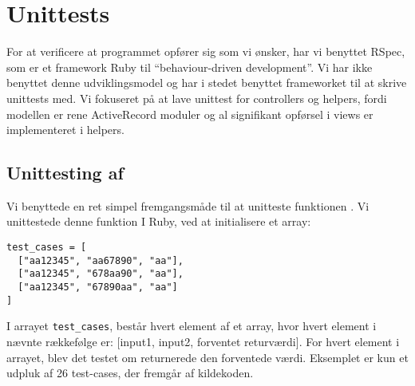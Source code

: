 \section{Unittests}
\label{sec:unittests}
For at verificere at programmet opfører sig som vi ønsker, har vi benyttet RSpec, som er et framework Ruby til ``behaviour-driven development''. Vi har ikke benyttet denne udviklingsmodel og har i stedet benyttet frameworket til at skrive unittests med.
Vi fokuseret på at lave unittest for controllers og helpers, fordi modellen er rene ActiveRecord moduler og al signifikant opførsel i views er implementeret i helpers.

\subsection{Unittesting af }
Vi benyttede en ret simpel fremgangsmåde til at unitteste funktionen . Vi unittestede denne funktion I Ruby, ved at initialisere et array:
\begin{lstlisting}
test_cases = [
  ["aa12345", "aa67890", "aa"],
  ["aa12345", "678aa90", "aa"],
  ["aa12345", "67890aa", "aa"]
]
\end{lstlisting}
I arrayet \texttt{test\_cases}, består hvert element af et array, hvor hvert element i nævnte rækkefølge er: [input1, input2, forventet returværdi].
For hvert element i arrayet, blev det testet om  returnerede den forventede værdi. Eksemplet er kun et udpluk af 26 test-cases, der fremgår af kildekoden.
